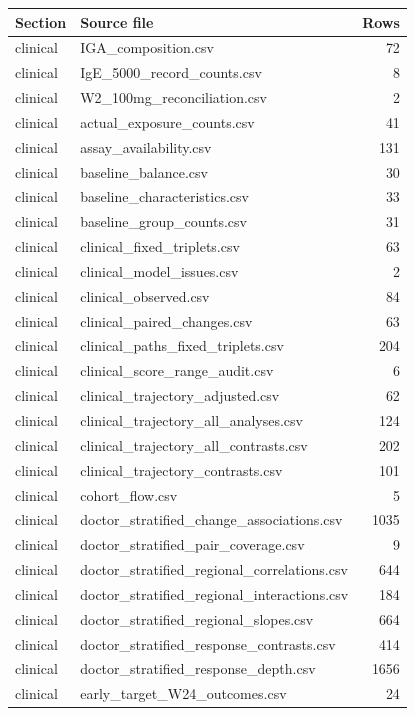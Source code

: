 \begin{longtable}{p{20mm}p{115mm}r}\toprule Section & Source file & Rows \\ \midrule\endhead
clinical & IGA\_composition.csv & 72 \\
clinical & IgE\_5000\_record\_counts.csv & 8 \\
clinical & W2\_100mg\_reconciliation.csv & 2 \\
clinical & actual\_exposure\_counts.csv & 41 \\
clinical & assay\_availability.csv & 131 \\
clinical & baseline\_balance.csv & 30 \\
clinical & baseline\_characteristics.csv & 33 \\
clinical & baseline\_group\_counts.csv & 31 \\
clinical & clinical\_fixed\_triplets.csv & 63 \\
clinical & clinical\_model\_issues.csv & 2 \\
clinical & clinical\_observed.csv & 84 \\
clinical & clinical\_paired\_changes.csv & 63 \\
clinical & clinical\_paths\_fixed\_triplets.csv & 204 \\
clinical & clinical\_score\_range\_audit.csv & 6 \\
clinical & clinical\_trajectory\_adjusted.csv & 62 \\
clinical & clinical\_trajectory\_all\_analyses.csv & 124 \\
clinical & clinical\_trajectory\_all\_contrasts.csv & 202 \\
clinical & clinical\_trajectory\_contrasts.csv & 101 \\
clinical & cohort\_flow.csv & 5 \\
clinical & doctor\_stratified\_change\_associations.csv & 1035 \\
clinical & doctor\_stratified\_pair\_coverage.csv & 9 \\
clinical & doctor\_stratified\_regional\_correlations.csv & 644 \\
clinical & doctor\_stratified\_regional\_interactions.csv & 184 \\
clinical & doctor\_stratified\_regional\_slopes.csv & 664 \\
clinical & doctor\_stratified\_response\_contrasts.csv & 414 \\
clinical & doctor\_stratified\_response\_depth.csv & 1656 \\
clinical & early\_target\_W24\_outcomes.csv & 24 \\

\end{longtable}
